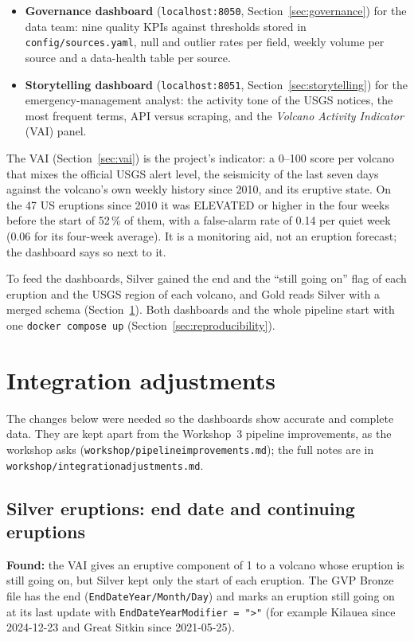 \documentclass[11pt,a4paper]{article}
\renewcommand{\_}{\textunderscore\allowbreak}
\begin{document}
\begin{itemize}
  \item \textbf{Governance dashboard} (\texttt{localhost:8050}, Section~\ref{sec:governance}) for the
        data team: nine quality KPIs against thresholds stored in \texttt{config/sources.yaml}, null and
        outlier rates per field, weekly volume per source and a data-health table per source.
  \item \textbf{Storytelling dashboard} (\texttt{localhost:8051}, Section~\ref{sec:storytelling}) for
        the emergency-management analyst: the activity tone of the USGS notices, the most frequent terms,
        API versus scraping, and the \emph{Volcano Activity Indicator} (VAI) panel.
\end{itemize}

The VAI (Section~\ref{sec:vai}) is the project's indicator: a 0--100 score per volcano that mixes the
official USGS alert level, the seismicity of the last seven days against the volcano's own weekly
history since 2010, and its eruptive state. On the 47 US eruptions since 2010 it was ELEVATED or higher
in the four weeks before the start of 52\,\% of them, with a false-alarm rate of 0.14 per quiet week
(0.06 for its four-week average). It is a monitoring aid, not an eruption forecast; the dashboard says so
next to it.

To feed the dashboards, Silver gained the end and the ``still going on'' flag of each eruption and the
USGS region of each volcano, and Gold reads Silver with a merged schema (Section~\ref{sec:integration}).
Both dashboards and the whole pipeline start with one \texttt{docker compose up}
(Section~\ref{sec:reproducibility}).

\section{Integration adjustments}\label{sec:integration}

The changes below were needed so the dashboards show accurate and complete data. They are kept apart
from the Workshop~3 pipeline improvements, as the workshop asks
(\texttt{workshop\_3/pipeline\_improvements.md}); the full notes are in
\texttt{workshop\_4/integration\_adjustments.md}.

\subsection{Silver eruptions: end date and continuing eruptions}
\textbf{Found:} the VAI gives an eruptive component of 1 to a volcano whose eruption is still going on,
but Silver kept only the start of each eruption. The GVP Bronze file has the end
(\texttt{EndDateYear/Month/Day}) and marks an eruption still going on at its last update with
\texttt{EndDateYearModifier = ">"} (for example Kilauea since 2024-12-23 and Great Sitkin since
2021-05-25).
\end{document}

